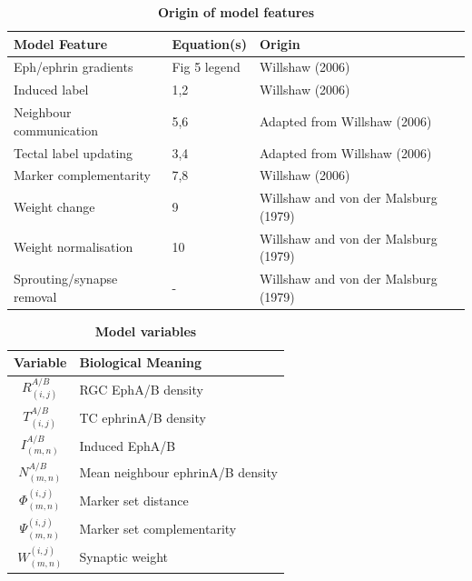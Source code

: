 \documentclass[11pt]{"article"}
\begin{document}
\begin{table}[h]
\caption{\textbf{Origin of model features}}
\begin{tabular}{|l|l|l|}
\hline
Model Feature & Equation(s) & Origin \\
\hline
Eph/ephrin gradients & Fig 5 legend & Willshaw (2006) \\
Induced label & 1,2 & Willshaw (2006) \\
Neighbour communication & 5,6 & Adapted from Willshaw (2006) \\
Tectal label updating & 3,4 & Adapted from Willshaw (2006) \\
Marker complementarity & 7,8 & Willshaw (2006) \\
Weight change & 9 & Willshaw and von der Malsburg (1979) \\
Weight normalisation & 10 & Willshaw and von der Malsburg (1979) \\
Sprouting/synapse removal & - & Willshaw and von der Malsburg (1979) \\
\hline
\end{tabular}
\end{table}

\vspace*{15pt}

\begin{table}[h]
\caption{\textbf{Model variables}}
\begin{tabular}{|c|l|}
\hline Variable & Biological Meaning \\ \hline
$R_{(i,j)}^{A/B}$ & RGC EphA/B density \\
$T_{(i,j)}^{A/B}$ & TC ephrinA/B density \\
$I_{(m,n)}^{A/B}$ & Induced EphA/B  \\
$N_{(m,n)}^{A/B}$ & Mean neighbour ephrinA/B density \\
$\Phi^{(i,j)}_{(m,n)}$ & Marker set distance \\
$\Psi^{(i,j)}_{(m,n)}$ & Marker set complementarity \\
$W^{(i,j)}_{(m,n)}$ & Synaptic weight \\ \hline
\end{tabular}
\end{table}
\end{document}
